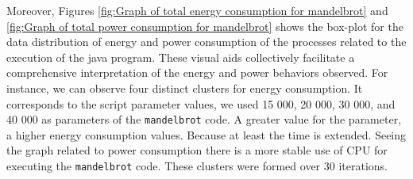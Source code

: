 Moreover, Figures \ref{fig:Graph of total energy consumption for mandelbrot} and \ref{fig:Graph of total power consumption for mandelbrot} 
shows the box-plot for the data distribution of energy and power consumption of the processes
related to the execution of the java program.
These visual aids collectively facilitate a comprehensive interpretation of the energy and power behaviors observed.
For instance, 
we can observe four distinct clusters for energy consumption. It corresponds to the script parameter values, we used 15 000, 20 000, 30 000, and 40 000 as parameters of the \texttt{mandelbrot} code. A greater value for the parameter, a higher energy consumption values. Because at least the time is extended. Seeing the graph related to power consumption there is a more stable use of CPU for executing the \texttt{mandelbrot} code. These clusters were formed over 30 iterations. %


